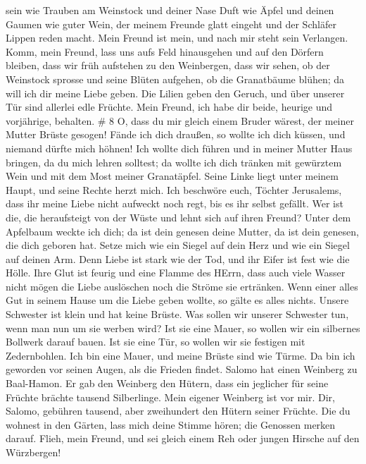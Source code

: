 sein wie Trauben am Weinstock und deiner Nase Duft wie Äpfel
 und deinen Gaumen wie guter Wein, der meinem Freunde glatt
eingeht und der Schläfer Lippen reden macht.  Mein Freund
ist mein, und nach mir steht sein Verlangen.  Komm, mein
Freund, lass uns aufs Feld hinausgehen und auf den Dörfern bleiben,
 dass wir früh aufstehen zu den Weinbergen, dass wir sehen,
ob der Weinstock sprosse und seine Blüten aufgehen, ob die Granatbäume
blühen; da will ich dir meine Liebe geben.  Die Lilien
geben den Geruch, und über unserer Tür sind allerlei edle Früchte. Mein
Freund, ich habe dir beide, heurige und vorjährige, behalten. \# 8
 O, dass du mir gleich einem Bruder wärest, der meiner
Mutter Brüste gesogen! Fände ich dich draußen, so wollte ich dich
küssen, und niemand dürfte mich höhnen!  Ich wollte dich
führen und in meiner Mutter Haus bringen, da du mich lehren solltest; da
wollte ich dich tränken mit gewürztem Wein und mit dem Most meiner
Granatäpfel.  Seine Linke liegt unter meinem Haupt, und
seine Rechte herzt mich.  Ich beschwöre euch, Töchter
Jerusalems, dass ihr meine Liebe nicht aufweckt noch regt, bis es ihr
selbst gefällt.  Wer ist die, die heraufsteigt von der Wüste
und lehnt sich auf ihren Freund? Unter dem Apfelbaum weckte ich dich; da
ist dein genesen deine Mutter, da ist dein genesen, die dich geboren
hat.  Setze mich wie ein Siegel auf dein Herz und wie ein
Siegel auf deinen Arm. Denn Liebe ist stark wie der Tod, und ihr Eifer
ist fest wie die Hölle. Ihre Glut ist feurig und eine Flamme des HErrn,
 dass auch viele Wasser nicht mögen die Liebe auslöschen
noch die Ströme sie ertränken. Wenn einer alles Gut in seinem Hause um
die Liebe geben wollte, so gälte es alles nichts.  Unsere
Schwester ist klein und hat keine Brüste. Was sollen wir unserer
Schwester tun, wenn man nun um sie werben wird?  Ist sie
eine Mauer, so wollen wir ein silbernes Bollwerk darauf bauen. Ist sie
eine Tür, so wollen wir sie festigen mit Zedernbohlen.  Ich
bin eine Mauer, und meine Brüste sind wie Türme. Da bin ich geworden vor
seinen Augen, als die Frieden findet.  Salomo hat einen
Weinberg zu Baal-Hamon. Er gab den Weinberg den Hütern, dass ein
jeglicher für seine Früchte brächte tausend Silberlinge. 
Mein eigener Weinberg ist vor mir. Dir, Salomo, gebühren tausend, aber
zweihundert den Hütern seiner Früchte.  Die du wohnest in
den Gärten, lass mich deine Stimme hören; die Genossen merken darauf.
 Flieh, mein Freund, und sei gleich einem Reh oder jungen
Hirsche auf den Würzbergen!
